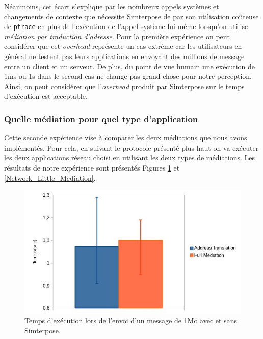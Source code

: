 Néanmoins, cet écart s'explique par les nombreux appels systèmes et changements de contexte que nécessite Simterpose de par son utilisation coûteuse de \texttt{ptrace} en plus de l'exécution de l'appel système lui-même lorsqu'on utilise \textit{médiation par traduction d'adresse}. Pour la première expérience on peut considérer que cet \textit{overhead} représente un cas extrême car les utilisateurs en général ne testent pas leurs applications en envoyant des millions de message entre un client et un serveur. De plus, du point de vue humain une exécution de 1ms ou 1s dans le second cas ne change pas grand chose pour notre perception. Ainsi, on peut considérer que l'\textit{overhead} produit par Simterpose sur le temps d'exécution est acceptable.

\subsubsection{Quelle médiation pour quel type d'application}
 Cette seconde expérience vise à comparer les deux médiations que nous avons implémentés. Pour cela, en suivant le protocole présenté plus haut on va exécuter les deux applications réseau choisi en utilisant les deux types de médiations. Les résultats de notre expérience sont présentés Figures \ref{Network_Big_Mediation} et \ref{Network_Little_Mediation}.

 \begin{figure}[H]
  \centering
    \includegraphics[scale=0.5]{mesures/graph/Bigmsg.jpg}
    \caption{Temps d'exécution lors de l'envoi d'un message de 1Mo avec et sans Simterpose.}
    \label{Network_Big_Mediation}
\end{figure}

